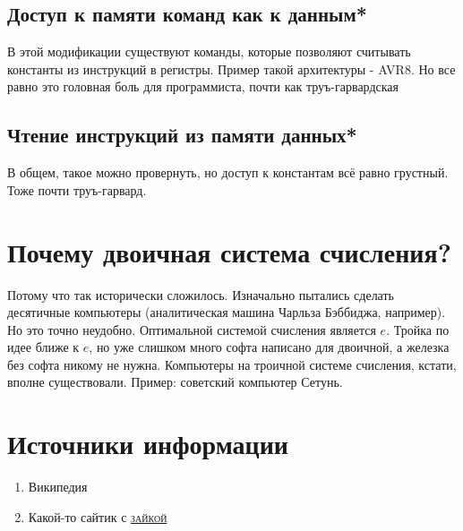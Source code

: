 \documentclass[12pt, a4paper]{article}
\begin{document}
\subsection{Доступ к памяти команд как к данным*}
В этой модификации существуют команды, которые позволяют считывать константы из инструкций в регистры. Пример такой архитектуры - AVR8. Но все равно это головная боль для программиста, почти как труъ-гарвардская
\subsection{Чтение инструкций из памяти данных*}
В общем, такое можно провернуть, но доступ к константам всё равно грустный. Тоже почти труъ-гарвард.
\section{Почему двоичная система счисления?}
Потому что так исторически сложилось. Изначально пытались сделать десятичные компьютеры (аналитическая машина Чарльза Бэббиджа, например). Но это точно неудобно. Оптимальной системой счисления является $e$. Тройка по идее ближе к $e$, но уже слишком много софта написано для двоичной, а железка без софта никому не нужна.
Компьютеры на троичной системе счисления, кстати, вполне существовали. Пример: советский компьютер Сетунь. 
\section{Источники информации}
\begin{enumerate}
    \item Википедия
    \item Какой-то сайтик с \href{http://ithare.com/modified-harvard-architecture-clarifying-confusion/}{\textsc{зайкой}}
\end{enumerate}
\end{document}
